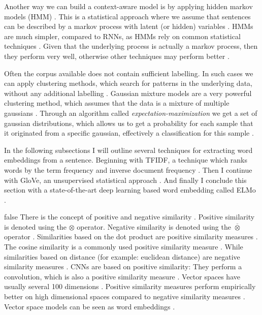 \documentclass[draft,final,oneside]{vutinfth} %
\begin{document}
Another way we can build a context-aware model is by applying hidden markov models (HMM) \cite{bishop}. This is a statistical approach where we assume that sentences can be described by a markov process with latent (or hidden) variables \cite{bishop}. HMMs are much simpler, compared to RNNs, as HMMs rely on common statistical techniques \cite{statisticalnlp}. Given that the underlying process is actually a markov process, then they perform very well, otherwise other techniques may perform better  \cite{statisticalnlp}.

Often the corpus available does not contain sufficient labelling. In such cases we can apply clustering methods, which search for patterns in the underlying data, without any additional labelling \cite{aimodern}. Gaussian mixture models are a very powerful clustering method, which assumes that the data is a mixture of multiple gaussians \cite{aimodern}. Through an algorithm called \textit{expectation-maximization} we get a set of gaussian distributions, which allows us to get a probability for each sample that it originated from a specific gaussian, effectively a classification for this sample \cite{bishop}.

In the following subsections I will outline several techniques for extracting word embeddings from a sentence. Beginning with TFIDF, a technique which ranks words by the term frequency and inverse document frequency \cite{tfidf}. Then I continue with GloVe, an unsupervised statistical approach \cite{pennington2014glove}. And finally I conclude this section with a state-of-the-art deep learning based word embedding called ELMo \cite{elmo}.

\if false
There is the concept of positive and negative similarity \cite{TUW-233295}. Positive similarity is denoted using the $\otimes$ operator. Negative similarity is denoted using the $\overline{\otimes}$ operator \cite{TUW-233295}. Similarities based on the dot product are positive similarity measures \cite{TUW-233295}. The cosine similarity is a commonly used positive similarity measure \cite{modernir}. While similarities based on distance (for example: euclidean distance) are negative similarity measures \cite{TUW-233295}. CNNs are based on positive similarity: They perform a convolution, which is also a positive similarity measure \cite{alexnet}. Vector spaces have usually several 100 dimensions \cite{bert}. Positive similarity measures perform empirically better on high dimensional spaces compared to negative similarity measures \cite{surprisinghighdimensional}. Vector space models can be seen as word embeddings \cite{elmo}.
\fi
\end{document}
